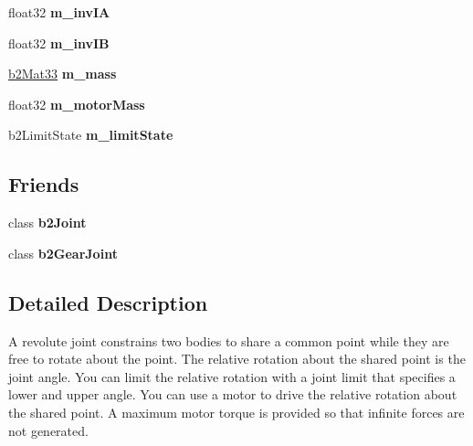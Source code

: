 \begin{DoxyCompactItemize}
\item 
\hypertarget{classb2_revolute_joint_a948a49144e282f7db22b1f20379c6099}{float32 {\bfseries m\-\_\-inv\-I\-A}}\label{classb2_revolute_joint_a948a49144e282f7db22b1f20379c6099}

\item 
\hypertarget{classb2_revolute_joint_a7c224fc59adebaa00590217ab8a2c685}{float32 {\bfseries m\-\_\-inv\-I\-B}}\label{classb2_revolute_joint_a7c224fc59adebaa00590217ab8a2c685}

\item 
\hypertarget{classb2_revolute_joint_a284ae761074305d5032a2b666efb0650}{\hyperlink{structb2_mat33}{b2\-Mat33} {\bfseries m\-\_\-mass}}\label{classb2_revolute_joint_a284ae761074305d5032a2b666efb0650}

\item 
\hypertarget{classb2_revolute_joint_aced7e455dd33ccb17a1d4ff9bb80c442}{float32 {\bfseries m\-\_\-motor\-Mass}}\label{classb2_revolute_joint_aced7e455dd33ccb17a1d4ff9bb80c442}

\item 
\hypertarget{classb2_revolute_joint_abe77594f4773d21dabd8912d6630dc6a}{b2\-Limit\-State {\bfseries m\-\_\-limit\-State}}\label{classb2_revolute_joint_abe77594f4773d21dabd8912d6630dc6a}

\end{DoxyCompactItemize}
\subsection*{Friends}
\begin{DoxyCompactItemize}
\item 
\hypertarget{classb2_revolute_joint_a54ade8ed3d794298108d7f4c4e4793fa}{class {\bfseries b2\-Joint}}\label{classb2_revolute_joint_a54ade8ed3d794298108d7f4c4e4793fa}

\item 
\hypertarget{classb2_revolute_joint_a13c275221e30bb485e17e4e04553cb71}{class {\bfseries b2\-Gear\-Joint}}\label{classb2_revolute_joint_a13c275221e30bb485e17e4e04553cb71}

\end{DoxyCompactItemize}


\subsection{Detailed Description}
A revolute joint constrains two bodies to share a common point while they are free to rotate about the point. The relative rotation about the shared point is the joint angle. You can limit the relative rotation with a joint limit that specifies a lower and upper angle. You can use a motor to drive the relative rotation about the shared point. A maximum motor torque is provided so that infinite forces are not generated. 

